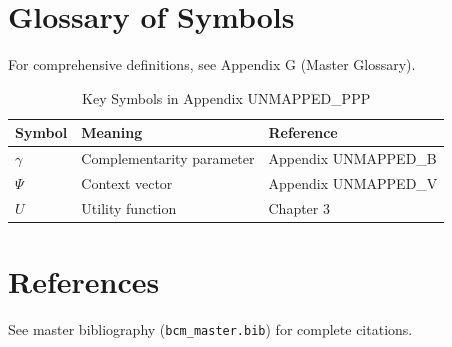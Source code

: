 \section{Glossary of Symbols}
\label{sec:ppp-glossary}

For comprehensive definitions, see Appendix G (Master Glossary).

\begin{table}[htbp]
\centering
\caption{Key Symbols in Appendix UNMAPPED_PPP}
\begin{tabular}{lll}
\toprule
\textbf{Symbol} & \textbf{Meaning} & \textbf{Reference} \\
\midrule
$\gamma$ & Complementarity parameter & Appendix UNMAPPED_B \\
$\Psi$ & Context vector & Appendix UNMAPPED_V \\
$U$ & Utility function & Chapter 3 \\
\bottomrule
\end{tabular}
\end{table}


\section{References}
\label{sec:references}

See master bibliography (\texttt{bcm\_master.bib}) for complete citations.

\nocite{bcm_master}


